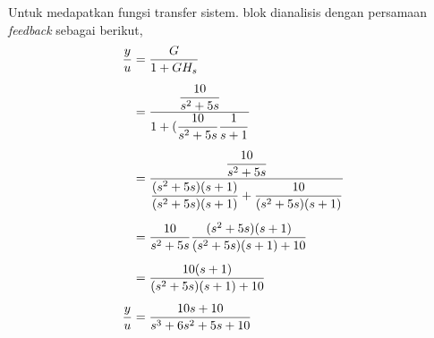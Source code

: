 \documentclass[../cover.tex]{subfiles}
\begin{document}
            Untuk medapatkan fungsi transfer sistem. blok dianalisis dengan persamaan \textit{feedback} sebagai berikut,
            \begin{equation}
                \begin{split}
                         \frac{y}{u} &= \frac{G}{1+GH_s} \\[5pt]
                                     &= \frac{\displaystyle \frac{10}{s^2+5s}}{\displaystyle 1+(\frac{10}{s^2+5s}\frac{1}{s+1}} \\[5pt]
                                     &= \frac{\displaystyle \frac{10}{s^2+5s}}{\displaystyle \frac{(s^2+5s)  (s+1)}{(s^2+5s)  (s+1)}+\frac{10}{(s^2+5s)  (s+1)}} \\[5pt]
                                     &= \frac{10}{s^2+5s}    \frac{(s^2+5s)  (s+1)}{(s^2+5s)  (s+1) + 10} \\[5pt]
                                     &= \frac{10  (s+1)}{(s^2+5s)  (s+1) + 10}\\[5pt]
                         \frac{y}{u} &= \frac{10s+10}{s^3+6s^2+5s+10}
                         \label{persamaan_9}
                \end{split}
            \end{equation}
\end{document}
